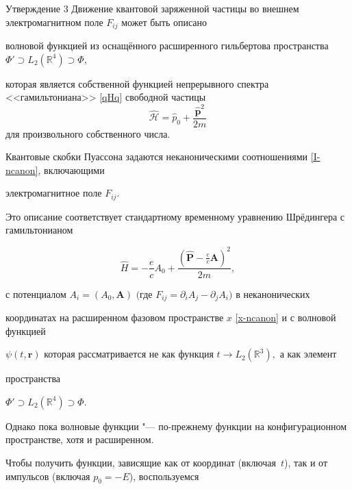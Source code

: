\begin{newthm}{Утверждение 3} Движение квантовой заряженной частицы во внешнем электромагнитном поле $F_{ij}$ может быть описано 

волновой функцией из оснащённого расширенного гильбертова пространства $\Phi'\supset L_2(\mathbb{R}^4)\supset\Phi,$

которая является собственной функцией непрерывного спектра <<гамильтониана>> \eqref{qHq} свободной частицы $$\mathcal{\hat H}=\hat p_0+\frac{\mathbf{\hat p}^2}{2m}$$ для произвольного собственного числа{\rm .}

Квантовые скобки Пуассона задаются неканоническими соотношениями \eqref{I-ncanon}{\rm ,} включающими

электромагнитное поле $F_{ij}.$

Это описание соответствует стандартному временному уравнению Шрёдингера с гамильтонианом


$$

\hat H=-\frac{e}{c}A_0+\frac{(\mathbf{\hat P}-\frac{e}{c}\mathbf{A})^2}{2m},

$$


с потенциалом $A_i=(A_0,\mathbf{A})$ $($где $F_{ij}=\partial_i A_j-\partial_j A_i)$ в неканонических

координатах на расширенном фазовом пространстве $x$ \eqref{x-ncanon} и с волновой функцией

$\psi(t,\mathbf{r})$ которая рассматривается не как функция $t\to L_2(\mathbb{R}^3),$ а как элемент

 пространства 

$\Phi'\supset L_2(\mathbb{R}^4)\supset\Phi.$

\end{newthm}




\smallskip




 Однако пока волновые функции "--- по-прежнему функции на конфигурационном пространстве, хотя и расширенном.

 Чтобы получить функции, зависящие как от координат (включая~$t$), так и от импульсов (включая $p_0=-E$), воспользуемся

